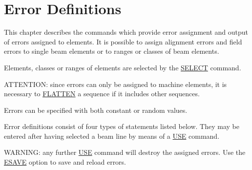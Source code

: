 
\chapter{Error Definitions}  
\label{chap:error}
This chapter describes the commands which provide error assignment and
output of errors assigned to elements. It is possible to assign
alignment errors and field errors to single beam elements or to ranges
or classes of beam elements.  

Elements, classes or ranges of elements are selected by the
\href{../Introduction/select.html}{SELECT} command.  

ATTENTION: since errors can only be assigned to machine elements, it is
necessary to  \href{../control/seqedit.html#flatten}{FLATTEN} a sequence
if it includes other sequences.  

Errors can be specified with both constant or random values. 

Error definitions consist of four types of statements listed below. They
may be entered after having selected a beam line by means of a
\href{../control/general.html#use}{USE} command.  

WARNING: any further \href{../control/general.html#use}{USE} command
will destroy the assigned errors. Use the
\href{../error/error_save.html}{ESAVE} option to save and reload errors.  




%


